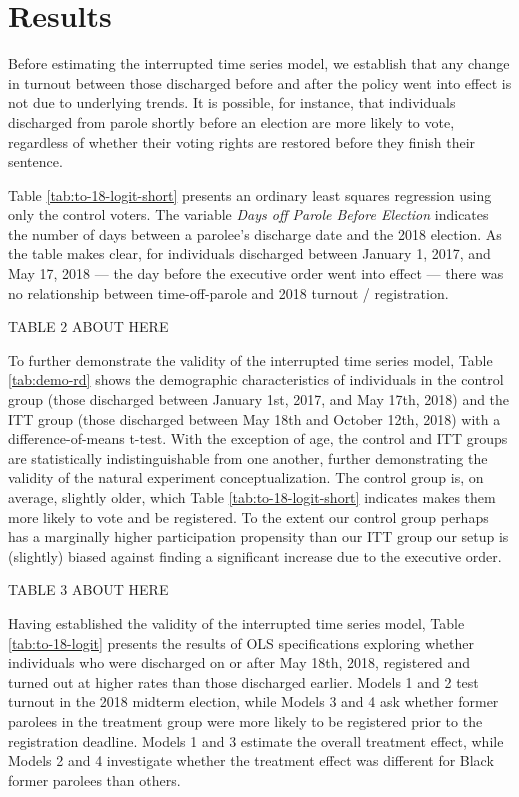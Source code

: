 \documentclass[
  12pt,
]{article}
\begin{document}
\hypertarget{results}{%
\section*{Results}\label{results}}

Before estimating the interrupted time series model, we establish that any change in turnout between those discharged before and after the policy went into effect is not due to underlying trends. It is possible, for instance, that individuals discharged from parole shortly before an election are more likely to vote, regardless of whether their voting rights are restored before they finish their sentence.

Table \ref{tab:to-18-logit-short} presents an ordinary least squares regression using only the control voters. The variable \emph{Days off Parole Before Election} indicates the number of days between a parolee's discharge date and the 2018 election. As the table makes clear, for individuals discharged between January 1, 2017, and May 17, 2018 --- the day before the executive order went into effect --- there was no relationship between time-off-parole and 2018 turnout / registration.

TABLE 2 ABOUT HERE

To further demonstrate the validity of the interrupted time series model, Table \ref{tab:demo-rd} shows the demographic characteristics of individuals in the control group (those discharged between January 1st, 2017, and May 17th, 2018) and the ITT group (those discharged between May 18th and October 12th, 2018) with a difference-of-means t-test. With the exception of age, the control and ITT groups are statistically indistinguishable from one another, further demonstrating the validity of the natural experiment conceptualization. The control group is, on average, slightly older, which Table \ref{tab:to-18-logit-short} indicates makes them more likely to vote and be registered. To the extent our control group perhaps has a marginally higher participation propensity than our ITT group our setup is (slightly) biased against finding a significant increase due to the executive order.

TABLE 3 ABOUT HERE

Having established the validity of the interrupted time series model, Table \ref{tab:to-18-logit} presents the results of OLS specifications exploring whether individuals who were discharged on or after May 18th, 2018, registered and turned out at higher rates than those discharged earlier. Models 1 and 2 test turnout in the 2018 midterm election, while Models 3 and 4 ask whether former parolees in the treatment group were more likely to be registered prior to the registration deadline. Models 1 and 3 estimate the overall treatment effect, while Models 2 and 4 investigate whether the treatment effect was different for Black former parolees than others.
\end{document}
